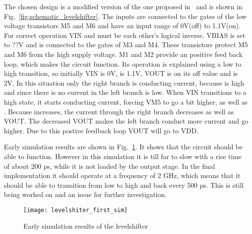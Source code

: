 The chosen design is a modified version of the one proposed in~\cite{powerdac} and is shown in Fig.~\ref{fig:schematic_levelshifter}. The inputs are connected to the gates of the low voltage transistors M5 and M6 and have an input range of 0V(off) to 1.1V(on). For correct operation VIN and  must be each other's logical inverse. VBIAS is set to ??V and is connected to the gates of M3 and M4. These transistors protect M5 and M6 from the high supply voltage. M1 and M2 provide an positive feed back loop, which makes the circuit function. Its operation is explained using a low to high transition, so initially VIN is 0V,  is 1.1V, VOUT is on its off value and  is 2V. In this situation only the right branch is conducting current, because  is high and since there is no current in the left branch  is low. When VIN transitions to a high state, it starts conducting current, forcing VM5 to go a bit higher, as well as . Because  increases, the current through the right branch decreases as well as VOUT. The decreased VOUT makes the left branch conduct more current and  go higher. Due to this postive feedback loop VOUT will go to VDD.

Early simulation results are shown in Fig.~\ref{fig:levelshifter_first_sim}. It shows that the circuit should be able to function. However in this simulation it is till far to slow with a rise time of about 200 ps, while it is not loaded by the output stage. In the final implementation it should operate at a frequency of 2 GHz, which means that it should be able to transition from low to high and back every 500 ps. This is still being worked on and an issue for further investigation.
\begin{figure}[h]
 \texttt{[image: levelshiter\_first\_sim]}
 \caption{Early simulation results of the levelshifter}
 \label{fig:levelshifter_first_sim}
\end{figure}